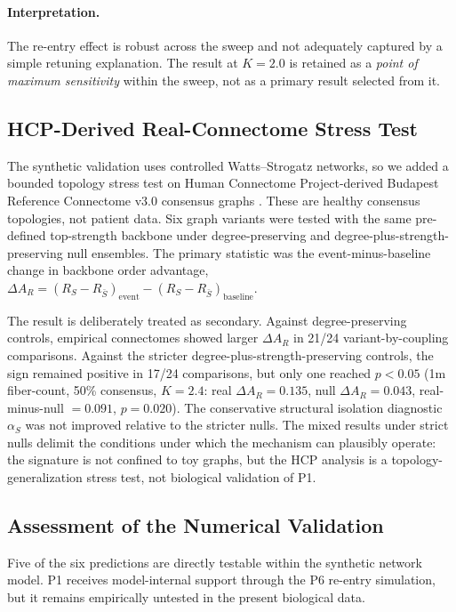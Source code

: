 \documentclass[11pt,a4paper]{article}
\theoremstyle{plain}
\theoremstyle{definition}
\theoremstyle{remark}
\begin{document}
\paragraph{Interpretation.} The re-entry effect is robust across the sweep and not adequately captured by a simple retuning explanation. The result at $K = 2.0$ is retained as a \emph{point of maximum sensitivity} within the sweep, not as a primary result selected from it.

\subsection{HCP-Derived Real-Connectome Stress Test}
\label{sec:hcp-connectome}

The synthetic validation uses controlled Watts--Strogatz networks, so we added a bounded topology stress test on Human Connectome Project-derived Budapest Reference Connectome v3.0 consensus graphs \citep{szalkai2015,szalkai2017}. These are healthy consensus topologies, not patient data. Six graph variants were tested with the same pre-defined top-strength backbone under degree-preserving and degree-plus-strength-preserving null ensembles. The primary statistic was the event-minus-baseline change in backbone order advantage, $\Delta A_R=(R_S-R_{\bar S})_{\mathrm{event}}-(R_S-R_{\bar S})_{\mathrm{baseline}}$.

The result is deliberately treated as secondary. Against degree-preserving controls, empirical connectomes showed larger $\Delta A_R$ in 21/24 variant-by-coupling comparisons. Against the stricter degree-plus-strength-preserving controls, the sign remained positive in 17/24 comparisons, but only one reached $p<0.05$ (1m fiber-count, 50\% consensus, $K=2.4$: real $\Delta A_R=0.135$, null $\Delta A_R=0.043$, real-minus-null $=0.091$, $p=0.020$). The conservative structural isolation diagnostic $\alpha_S$ was not improved relative to the stricter nulls. The mixed results under strict nulls delimit the conditions under which the mechanism can plausibly operate: the signature is not confined to toy graphs, but the HCP analysis is a topology-generalization stress test, not biological validation of P1.

\subsection{Assessment of the Numerical Validation}

Five of the six predictions are directly testable within the synthetic network model. P1 receives model-internal support through the P6 re-entry simulation, but it remains empirically untested in the present biological data.
\end{document}
